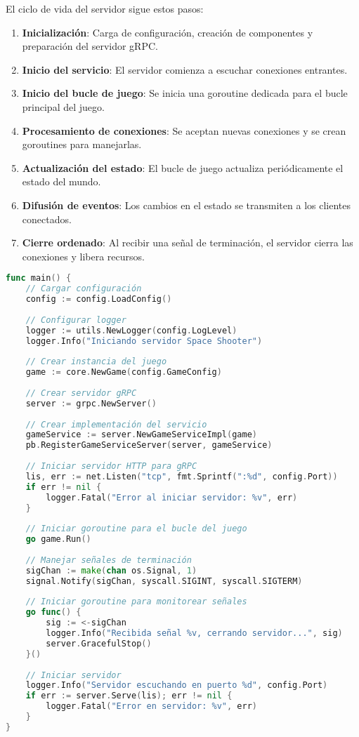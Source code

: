 \documentclass[12pt,letterpaper]{article}
\begin{document}
El ciclo de vida del servidor sigue estos pasos:

\begin{enumerate}
    \item \textbf{Inicialización}: Carga de configuración, creación de componentes y preparación del servidor gRPC.
    \item \textbf{Inicio del servicio}: El servidor comienza a escuchar conexiones entrantes.
    \item \textbf{Inicio del bucle de juego}: Se inicia una goroutine dedicada para el bucle principal del juego.
    \item \textbf{Procesamiento de conexiones}: Se aceptan nuevas conexiones y se crean goroutines para manejarlas.
    \item \textbf{Actualización del estado}: El bucle de juego actualiza periódicamente el estado del mundo.
    \item \textbf{Difusión de eventos}: Los cambios en el estado se transmiten a los clientes conectados.
    \item \textbf{Cierre ordenado}: Al recibir una señal de terminación, el servidor cierra las conexiones y libera recursos.
\end{enumerate}

\begin{lstlisting}[language=go, caption=Inicialización del servidor]
func main() {
    // Cargar configuración
    config := config.LoadConfig()
    
    // Configurar logger
    logger := utils.NewLogger(config.LogLevel)
    logger.Info("Iniciando servidor Space Shooter")
    
    // Crear instancia del juego
    game := core.NewGame(config.GameConfig)
    
    // Crear servidor gRPC
    server := grpc.NewServer()
    
    // Crear implementación del servicio
    gameService := server.NewGameServiceImpl(game)
    pb.RegisterGameServiceServer(server, gameService)
    
    // Iniciar servidor HTTP para gRPC
    lis, err := net.Listen("tcp", fmt.Sprintf(":%d", config.Port))
    if err != nil {
        logger.Fatal("Error al iniciar servidor: %v", err)
    }
    
    // Iniciar goroutine para el bucle del juego
    go game.Run()
    
    // Manejar señales de terminación
    sigChan := make(chan os.Signal, 1)
    signal.Notify(sigChan, syscall.SIGINT, syscall.SIGTERM)
    
    // Iniciar goroutine para monitorear señales
    go func() {
        sig := <-sigChan
        logger.Info("Recibida señal %v, cerrando servidor...", sig)
        server.GracefulStop()
    }()
    
    // Iniciar servidor
    logger.Info("Servidor escuchando en puerto %d", config.Port)
    if err := server.Serve(lis); err != nil {
        logger.Fatal("Error en servidor: %v", err)
    }
}
\end{lstlisting}
\end{document}
